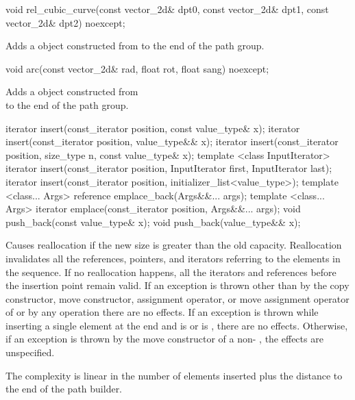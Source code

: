 %
\begin{itemdecl}
void rel_cubic_curve(const vector_2d& dpt0, const vector_2d& dpt1,
  const vector_2d& dpt2) noexcept;
\end{itemdecl}
\begin{itemdescr}
\pnum
\effects
Adds a  object constructed from  to the end of the path group.
\end{itemdescr}

%
\begin{itemdecl}
void arc(const vector_2d& rad, float rot, float sang) noexcept;
\end{itemdecl}
\begin{itemdescr}
\pnum
\effects
Adds a  object constructed from \\  to the end of the path group.
\end{itemdescr}

%
%
%
\begin{itemdecl}
iterator insert(const_iterator position, const value_type& x);
iterator insert(const_iterator position, value_type&& x);
iterator insert(const_iterator position, size_type n, const value_type& x);
template <class InputIterator>
iterator insert(const_iterator position, InputIterator first,
  InputIterator last);
iterator insert(const_iterator position, initializer_list<value_type>);
template <class... Args>
reference emplace_back(Args&&... args);
template <class... Args>
iterator emplace(const_iterator position, Args&&... args);
void push_back(const value_type& x);
void push_back(value_type&& x);
\end{itemdecl}

\begin{itemdescr}
\pnum
\remarks
Causes reallocation if the new size is greater than the old capacity.
Reallocation invalidates all the references, pointers, and iterators
referring to the elements in the sequence.
If no reallocation happens, all the iterators and references before the insertion point remain valid.
If an exception is thrown other than by
the copy constructor, move constructor,
assignment operator, or move assignment operator of
 or by any  operation
there are no effects.
If an exception is thrown while inserting a single element at the end and
 is  or 
is , there are no effects.
Otherwise, if an exception is thrown by the move constructor of a non-
, the effects are unspecified.

\pnum
\complexity
The complexity is linear in the number of elements inserted plus the 
distance to the end of the path builder.
\end{itemdescr}

